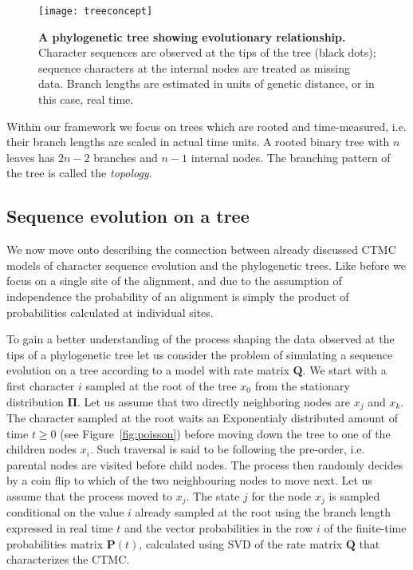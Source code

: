 \begin{figure}[H]
\centering
\texttt{[image: treeconcept]} 
\caption{
{ \footnotesize 
{\bf A phylogenetic tree showing evolutionary relationship.} Character sequences are observed at the tips of the tree (black dots); sequence characters at the internal nodes are treated as missing data. 
Branch lengths are estimated in units of genetic distance, or in this case, real time.
} %
}
\label{fig:treeconcept}
\end{figure}

Within our framework we focus on trees which are rooted and time-measured, i.e. their branch lengths are scaled in actual time units.
A rooted binary tree with $n$ leaves has $2n-2$ branches and $n-1$ internal nodes.
The branching pattern of the tree is called the \emph{topology}. 

\subsection{Sequence evolution on a tree\label{sub:evolutionOnTree}}

We now move onto describing the connection between already discussed CTMC models of character sequence evolution and the phylogenetic trees.
Like before we focus on a single site of the alignment, and due to the assumption of independence the probability of an alignment is simply the product of probabilities calculated at individual sites.

To gain a better understanding of the process shaping the data observed at the tips of a phylogenetic tree let us consider the problem of simulating a sequence evolution on a tree according to a model with rate matrix $\mathbf{Q}$.
We start with a first character $i$ sampled at the root of the tree $x_0$ from the stationary distribution $\mathbf{\Pi}$.
Let us assume that two directly neighboring nodes are $x_j$ and $x_k$.
The character sampled at the root waits an Exponentialy distributed amount of time $t\geq0$ (see Figure~\ref{fig:poisson}) before moving down the tree to one of the children nodes $x_i$.
Such traversal is said to be following the pre-order, i.e. parental nodes are visited before child nodes.   
The process then randomly decides by a coin flip to which of the two neighbouring nodes to move next.
Let us assume that the process moved to $x_j$.
The state $j$ for the node $x_j$ is sampled conditional on the value $i$ already sampled at the root using the branch length expressed in real time $t$ and the vector probabilities in the row $i$ of the finite-time probabilities matrix $\mathbf{P}(t)$, calculated using SVD of the rate matrix $\mathbf{Q}$ that characterizes the CTMC.   

